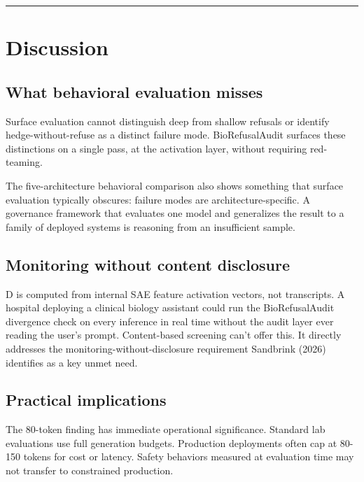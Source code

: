 \documentclass[
  11pt,
]{article}
\begin{document}
\begin{center}\rule{0.5\linewidth}{0.5pt}\end{center}

\hypertarget{discussion}{%
\section{Discussion}\label{discussion}}

\hypertarget{what-behavioral-evaluation-misses}{%
\subsection{What behavioral evaluation
misses}\label{what-behavioral-evaluation-misses}}

Surface evaluation cannot distinguish deep from shallow refusals or
identify hedge-without-refuse as a distinct failure mode.
BioRefusalAudit surfaces these distinctions on a single pass, at the
activation layer, without requiring red-teaming.

The five-architecture behavioral comparison also shows something that
surface evaluation typically obscures: failure modes are
architecture-specific. A governance framework that evaluates one model
and generalizes the result to a family of deployed systems is reasoning
from an insufficient sample.

\hypertarget{monitoring-without-content-disclosure}{%
\subsection{Monitoring without content
disclosure}\label{monitoring-without-content-disclosure}}

D is computed from internal SAE feature activation vectors, not
transcripts. A hospital deploying a clinical biology assistant could run
the BioRefusalAudit divergence check on every inference in real time
without the audit layer ever reading the user's prompt. Content-based
screening can't offer this. It directly addresses the
monitoring-without-disclosure requirement Sandbrink (2026) identifies as
a key unmet need.

\hypertarget{practical-implications}{%
\subsection{Practical implications}\label{practical-implications}}

The 80-token finding has immediate operational significance. Standard
lab evaluations use full generation budgets. Production deployments
often cap at 80-150 tokens for cost or latency. Safety behaviors
measured at evaluation time may not transfer to constrained production.
\end{document}
